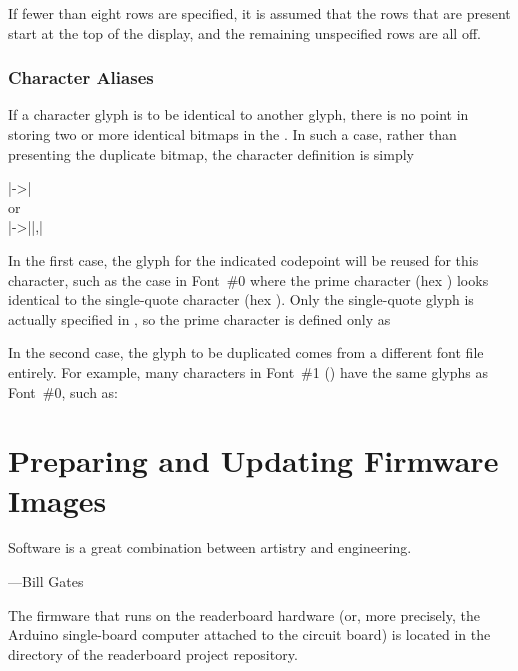 If fewer than eight rows are specified, it is assumed that the rows that are present
start at the top of the display, and the remaining unspecified rows are all off.

\subsection{Character Aliases}
If a character glyph is to be identical to another glyph, there is no point
in storing two or more identical bitmaps in the . In such a case,
rather than presenting the duplicate bitmap, the character definition
is simply
\begin{center}
	\begin{Coding}
		|->|\\
		or\\
		|->||,|
	\end{Coding}
\end{center}
In the first case, the glyph for the indicated codepoint will be reused for this character,
such as the case in Font~\#0 where the prime character (hex ) looks identical to
the single-quote character (hex ). Only the single-quote glyph is actually specified
in , so the prime character is defined only as

In the second case, the glyph to be duplicated comes from a different font file entirely.
For example, many characters in Font~\#1 () have the same glyphs
as Font~\#0, such as:

%                                                     
\chapter{Preparing and Updating Firmware Images}\label{chap:firmware}
\epigraph{Software is a great combination between artistry and engineering.}{---Bill Gates}
The firmware that runs on the readerboard hardware (or, more precisely, the Arduino single-board
computer attached to the circuit board) is located in the  directory of the
readerboard project repository.


